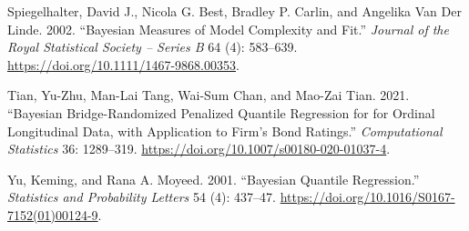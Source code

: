 \begin{CSLReferences}{1}{0}
\leavevmode{}%
Spiegelhalter, David J., Nicola G. Best, Bradley P. Carlin, and Angelika Van Der Linde. 2002. {``Bayesian Measures of Model Complexity and Fit.''} \emph{{Journal of the Royal Statistical Society -- Series B}} 64 (4): 583--639. \url{https://doi.org/10.1111/1467-9868.00353}.

\leavevmode{}%
Tian, Yu-Zhu, Man-Lai Tang, Wai-Sum Chan, and Mao-Zai Tian. 2021. {``Bayesian Bridge-Randomized Penalized Quantile Regression for for Ordinal Longitudinal Data, with Application to Firm's Bond Ratings.''} \emph{Computational Statistics} 36: 1289--319. \url{https://doi.org/10.1007/s00180-020-01037-4}.

\leavevmode{}%
Yu, Keming, and Rana A. Moyeed. 2001. {``Bayesian Quantile Regression.''} \emph{Statistics and Probability Letters} 54 (4): 437--47. \url{https://doi.org/10.1016/S0167-7152(01)00124-9}.

\end{CSLReferences}


\address{%
Prajual Maheshwari\\
Quantitative Researcher, Ogha Research\\%
2123, 14th Main Road, HAL 3rd Stage, Kodihalli, Bengaluru, Karnataka,
India\\ \url{https://prajual.netlify.app}\\ \href{mailto:prajual1391@gmail.com}{\texttt{prajual1391@gmail.com}}\\
%
%
%
%
}

\address{%
Mohammad Arshad Rahman\\
Department of Economic Sciences, Indian Institute of Technology
Kanpur\\%
Room 672, Faculty Building, Indian Institute of Technology Kanpur,
India\\ \url{https://www.arshadrahman.com}\\ \emph{ORCiD: \href{https://orcid.org/0000-0001-8434-0042}{0000-0001-8434-0042}}\\ \href{mailto:marshad@iitk.ac.in}{\texttt{marshad@iitk.ac.in}},
\href{mailto:arshadrahman25@gmail.com}{\texttt{arshadrahman25@gmail.com}}\\
%
%
%
%
}
